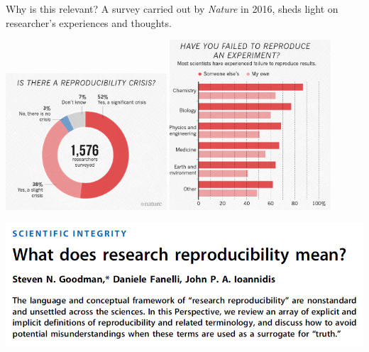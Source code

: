 \documentclass[
  10pt,
  ignorenonframetext,
]{beamer}
\begin{document}
\begin{frame}{Why is this relevant?}
\protect\hypertarget{why-is-this-relevant}{}
A survey carried out by \emph{Nature} in 2016, sheds light on
researcher's experiences and thoughts.

\includegraphics[width=0.45\textwidth,height=\textheight]{graphics/rep_crisis.png}
\includegraphics[width=0.45\textwidth,height=\textheight]{graphics/failed.png}
\end{frame}

\begin{frame}
\includegraphics{graphics/reproducibility.png}
\end{frame}
\end{document}
